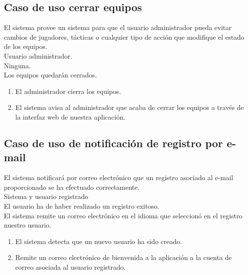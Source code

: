 \subsection{Caso de uso cerrar equipos}
 El sistema provee un sistema para que el usuario
administrador pueda evitar cambios de jugadores, tácticas o
cualquier tipo de acción que modifique el estado de los equipos.\\
 Usuario administrador. \\
 Ninguna. \\
 Los equipos quedarán cerrados. \\
\begin{enumerate}
\item El administrador cierra los equipos.
\item El sistema avisa al administrador que acaba de cerrar los equipos a través
  de la interfaz web de nuestra aplicación.
\end{enumerate}

\subsection*{Caso de uso de notificación de registro por e-mail}
 El sistema notificará por correo electrónico
que un registro asociado al e-mail proporcionado se ha efectuado correctamente.\\
 Sistema y usuario registrado \\
 El usuario ha de haber realizado un registro exitoso. \\
 El sistema remite un correo electrónico en
el idioma que seleccionó en el registro nuestro usuario. \\
\begin{enumerate}
\item El sistema detecta que un nuevo usuario ha sido creado.
\item Remite un correo electrónico de bienvenida a la aplicación a la cuenta de
  correo asociada al usuario registrado.
\end{enumerate}

